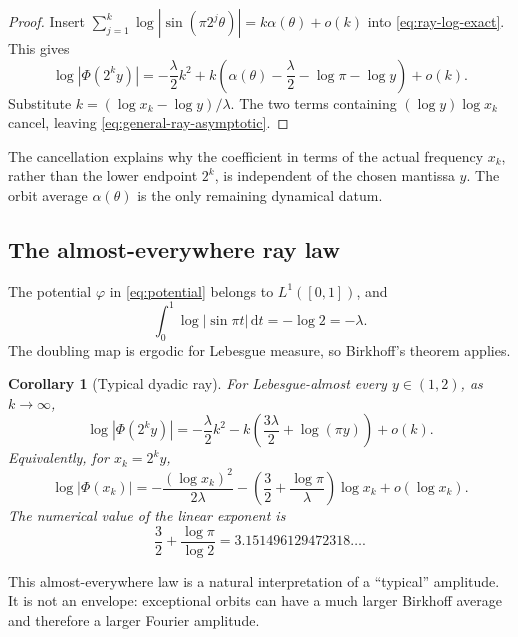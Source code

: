 \documentclass[11pt,oneside]{article}
\newtheorem{corollary}[corollary]{Corollary}
\theoremstyle{definition}
\theoremstyle{remark}
\newcommand{\dd}{\,\mathrm d}
\newcommand{\smallo}{o}
\newcommand{\PhiF}{\Phi}
\begin{document}
\begin{proof}
Insert
\(
 \sum_{j=1}^{k}\log|\sin(\pi2^j\theta)|
 =k\alpha(\theta)+\smallo(k)
\)
into \eqref{eq:ray-log-exact}.  This gives
\[
 \log|\PhiF(2^k y)|
 =-\frac{\lambda}{2}k^2
 +k\left(\alpha(\theta)-\frac\lambda2-\log\pi-\log y\right)
 +\smallo(k).
\]
Substitute \(k=(\log x_k-\log y)/\lambda\).  The two terms containing
\((\log y)\log x_k\) cancel, leaving \eqref{eq:general-ray-asymptotic}.
\end{proof}

The cancellation explains why the coefficient in terms of the actual
frequency \(x_k\), rather than the lower endpoint \(2^k\), is independent of
the chosen mantissa \(y\).  The orbit average \(\alpha(\theta)\) is the only
remaining dynamical datum.

\subsection{The almost-everywhere ray law}

The potential \(\varphi\) in \eqref{eq:potential} belongs to \(L^1([0,1])\),
and
\begin{equation}
 \int_0^1\log|\sin\pi t|\dd t=-\log2=-\lambda.
 \label{eq:log-sine-integral}
\end{equation}
The doubling map is ergodic for Lebesgue measure, so Birkhoff's theorem applies.

\begin{corollary}[Typical dyadic ray]
\label{cor:typical-ray}
For Lebesgue-almost every \(y\in(1,2)\), as \(k\to\infty\),
\begin{equation}
 \log|\PhiF(2^k y)|
 =-\frac{\lambda}{2}k^2
 -k\left(\frac{3\lambda}{2}+\log(\pi y)\right)
 +\smallo(k).
 \label{eq:typical-k}
\end{equation}
Equivalently, for \(x_k=2^k y\),
\begin{equation}
 \log|\PhiF(x_k)|
 =-\frac{(\log x_k)^2}{2\lambda}
 -\left(\frac32+\frac{\log\pi}{\lambda}\right)\log x_k
 +\smallo(\log x_k).
 \label{eq:typical-x}
\end{equation}
The numerical value of the linear exponent is
\[
 \frac32+\frac{\log\pi}{\log2}
 =3.151496129472318\ldots.
\]
\end{corollary}

This almost-everywhere law is a natural interpretation of a ``typical''
amplitude.  It is not an envelope: exceptional orbits can have a much larger
Birkhoff average and therefore a larger Fourier amplitude.
\end{document}
